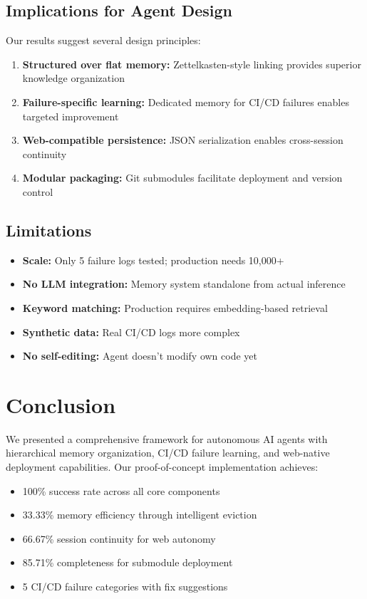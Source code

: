 \documentclass{article}
\begin{document}
\subsection{Implications for Agent Design}

Our results suggest several design principles:

\begin{enumerate}
    \item \textbf{Structured over flat memory:} Zettelkasten-style linking provides superior knowledge organization
    \item \textbf{Failure-specific learning:} Dedicated memory for CI/CD failures enables targeted improvement
    \item \textbf{Web-compatible persistence:} JSON serialization enables cross-session continuity
    \item \textbf{Modular packaging:} Git submodules facilitate deployment and version control
\end{enumerate}

\subsection{Limitations}

\begin{itemize}
    \item \textbf{Scale:} Only 5 failure logs tested; production needs 10,000+
    \item \textbf{No LLM integration:} Memory system standalone from actual inference
    \item \textbf{Keyword matching:} Production requires embedding-based retrieval
    \item \textbf{Synthetic data:} Real CI/CD logs more complex
    \item \textbf{No self-editing:} Agent doesn't modify own code yet
\end{itemize}

\section{Conclusion}

We presented a comprehensive framework for autonomous AI agents with hierarchical memory organization, CI/CD failure learning, and web-native deployment capabilities. Our proof-of-concept implementation achieves:

\begin{itemize}
    \item 100\% success rate across all core components
    \item 33.33\% memory efficiency through intelligent eviction
    \item 66.67\% session continuity for web autonomy
    \item 85.71\% completeness for submodule deployment
    \item 5 CI/CD failure categories with fix suggestions
\end{itemize}
\end{document}
